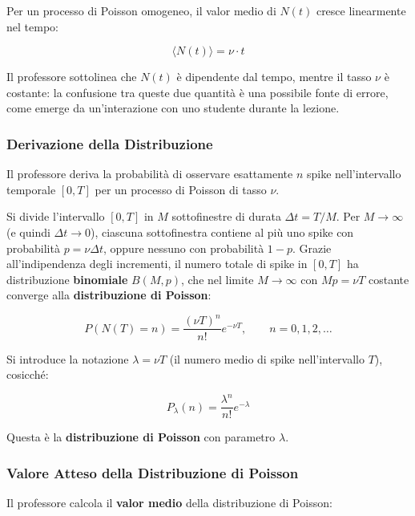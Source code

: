Per un processo di Poisson omogeneo, il valor medio di $N(t)$ cresce linearmente nel tempo:

\begin{equation}
\langle N(t) \rangle = \nu \cdot t
\end{equation}

Il professore sottolinea che $N(t)$ è dipendente dal tempo, mentre il tasso $\nu$ è costante: la confusione tra queste due quantità è una possibile fonte di errore, come emerge da un'interazione con uno studente durante la lezione.


\subsubsection{Derivazione della Distribuzione}

Il professore deriva la probabilità di osservare esattamente $n$ spike nell'intervallo temporale $[0, T]$ per un processo di Poisson di tasso $\nu$.

Si divide l'intervallo $[0, T]$ in $M$ sottofinestre di durata $\Delta t = T/M$. Per $M \to \infty$ (e quindi $\Delta t \to 0$), ciascuna sottofinestra contiene al più uno spike con probabilità $p = \nu \Delta t$, oppure nessuno con probabilità $1-p$. Grazie all'indipendenza degli incrementi, il numero totale di spike in $[0, T]$ ha distribuzione \textbf{binomiale} $B(M, p)$, che nel limite $M \to \infty$ con $Mp = \nu T$ costante converge alla \textbf{distribuzione di Poisson}:

\begin{equation}
P(N(T) = n) = \frac{(\nu T)^n}{n!} e^{-\nu T}, \qquad n = 0, 1, 2, \ldots
\end{equation}

Si introduce la notazione $\lambda = \nu T$ (il numero medio di spike nell'intervallo $T$), cosicché:

\begin{equation}
P_\lambda(n) = \frac{\lambda^n}{n!} e^{-\lambda}
\end{equation}

Questa è la \textbf{distribuzione di Poisson} con parametro $\lambda$.

\subsubsection{Valore Atteso della Distribuzione di Poisson}

Il professore calcola il \textbf{valor medio} della distribuzione di Poisson:

